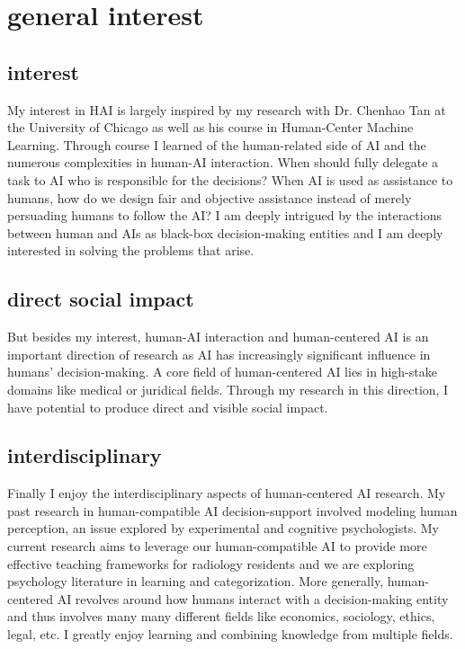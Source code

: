 
\section{general interest }






\subsection{interest}
My interest in HAI is largely inspired by my research with Dr. Chenhao Tan at the University of Chicago as well as his course in Human-Center Machine Learning. 
Through course I learned of the human-related side of AI and the numerous complexities in human-AI interaction. When should fully delegate a task to AI who is responsible for the decisions? When AI is used as assistance to humans, how do we design fair and objective assistance instead of merely persuading humans to follow the AI? 
I am deeply intrigued by the interactions between human and AIs as black-box decision-making entities and I am deeply interested in solving the problems that arise.

\subsection{direct social impact}
But besides my interest, human-AI interaction and human-centered AI is an important direction of research as AI has increasingly significant influence in humans' decision-making. A core field of human-centered AI lies in high-stake domains like medical or juridical fields. Through my research in this direction, I have potential to produce direct and visible social impact.


\subsection{interdisciplinary}
Finally I enjoy the interdisciplinary aspects of human-centered AI research. My past research in human-compatible AI decision-support involved modeling human perception, an issue explored by experimental and cognitive psychologists. My current research aims to leverage our human-compatible AI to provide more effective teaching frameworks for radiology residents and we are exploring psychology literature in learning and categorization. More generally, human-centered AI revolves around how humans interact with a decision-making entity and thus involves many many different fields like economics, sociology, ethics, legal, etc. I greatly enjoy learning and combining knowledge from multiple fields. 




